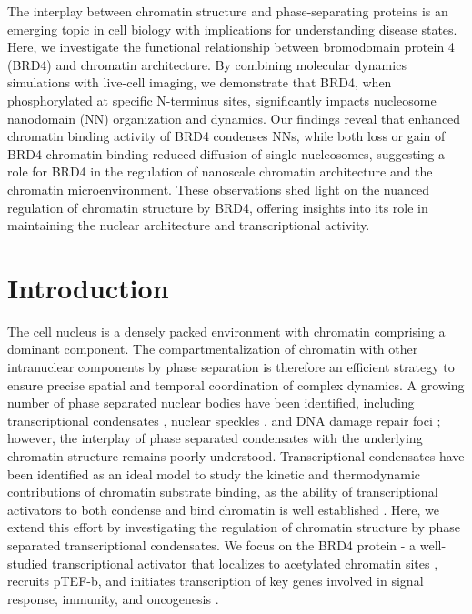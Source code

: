 The interplay between chromatin structure and phase-separating proteins is an emerging topic in cell biology with implications for understanding disease states. Here, we investigate the functional relationship between bromodomain protein 4 (BRD4) and chromatin architecture. By combining molecular dynamics simulations with live-cell imaging, we demonstrate that BRD4, when phosphorylated at specific N-terminus sites, significantly impacts nucleosome nanodomain (NN) organization and dynamics. Our findings reveal that enhanced chromatin binding activity of BRD4 condenses NNs, while both loss or gain of BRD4 chromatin binding reduced diffusion of single nucleosomes, suggesting a role for BRD4 in the regulation of nanoscale chromatin architecture and the chromatin microenvironment. These observations shed light on the nuanced regulation of chromatin structure by BRD4, offering insights into its role in maintaining the nuclear architecture and transcriptional activity.

\section{Introduction}

The cell nucleus is a densely packed environment with chromatin comprising a dominant component. The compartmentalization of chromatin with other intranuclear components by phase separation is therefore an efficient strategy to ensure precise spatial and temporal coordination of complex dynamics. A growing number of phase separated nuclear bodies have been identified, including transcriptional condensates \parencite{Sabari2018,Hnisz2017}, nuclear speckles \parencite{Brown2008}, and DNA damage repair foci \parencite{Wang2023}; however, the interplay of phase separated condensates with the underlying chromatin structure remains poorly understood. Transcriptional condensates have been identified as an ideal model to study the kinetic and thermodynamic contributions of chromatin substrate binding, as the ability of transcriptional activators to both condense and bind chromatin is well established \parencite{Sabari2018,Wagh2021,Plys2018,Strom2024,Ma2021}. Here, we extend this effort by investigating the regulation of chromatin structure by phase separated transcriptional condensates. We focus on the BRD4 protein - a well-studied transcriptional activator that localizes to acetylated chromatin sites \parencite{Wu2018}, recruits pTEF-b, and initiates transcription of key genes involved in signal response, immunity, and oncogenesis \parencite{Itzen2014}.

